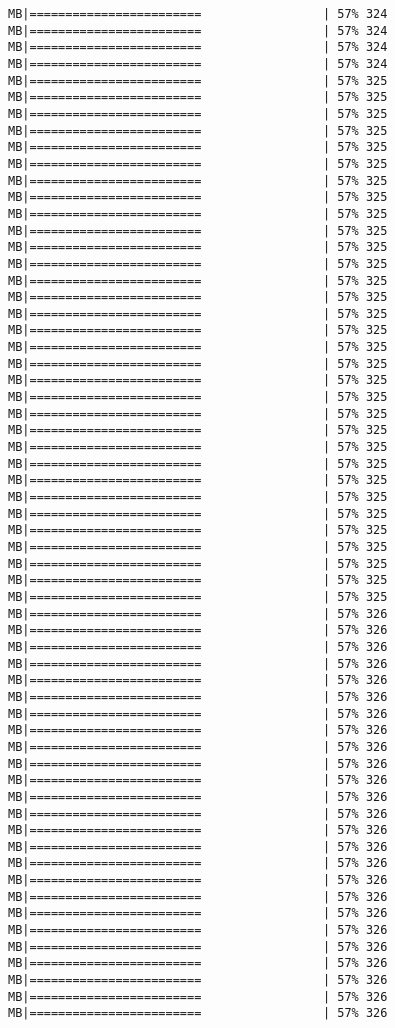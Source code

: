 \documentclass[
]{article}
\begin{document}
\begin{verbatim}
MB|========================                 | 57% 324 MB|========================                 | 57% 324 MB|========================                 | 57% 324 MB|========================                 | 57% 324 MB|========================                 | 57% 325 MB|========================                 | 57% 325 MB|========================                 | 57% 325 MB|========================                 | 57% 325 MB|========================                 | 57% 325 MB|========================                 | 57% 325 MB|========================                 | 57% 325 MB|========================                 | 57% 325 MB|========================                 | 57% 325 MB|========================                 | 57% 325 MB|========================                 | 57% 325 MB|========================                 | 57% 325 MB|========================                 | 57% 325 MB|========================                 | 57% 325 MB|========================                 | 57% 325 MB|========================                 | 57% 325 MB|========================                 | 57% 325 MB|========================                 | 57% 325 MB|========================                 | 57% 325 MB|========================                 | 57% 325 MB|========================                 | 57% 325 MB|========================                 | 57% 325 MB|========================                 | 57% 325 MB|========================                 | 57% 325 MB|========================                 | 57% 325 MB|========================                 | 57% 325 MB|========================                 | 57% 325 MB|========================                 | 57% 325 MB|========================                 | 57% 325 MB|========================                 | 57% 325 MB|========================                 | 57% 325 MB|========================                 | 57% 325 MB|========================                 | 57% 326 MB|========================                 | 57% 326 MB|========================                 | 57% 326 MB|========================                 | 57% 326 MB|========================                 | 57% 326 MB|========================                 | 57% 326 MB|========================                 | 57% 326 MB|========================                 | 57% 326 MB|========================                 | 57% 326 MB|========================                 | 57% 326 MB|========================                 | 57% 326 MB|========================                 | 57% 326 MB|========================                 | 57% 326 MB|========================                 | 57% 326 MB|========================                 | 57% 326 MB|========================                 | 57% 326 MB|========================                 | 57% 326 MB|========================                 | 57% 326 MB|========================                 | 57% 326 MB|========================                 | 57% 326 MB|========================                 | 57% 326 MB|========================                 | 57% 326 MB|========================                 | 57% 326 MB|========================                 | 57% 326 MB|========================                 | 57% 326 
\end{verbatim}
\end{document}
